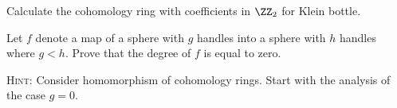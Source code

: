 



\exercises
\begin{xca}
Calculate the cohomology ring with coefficients in $\ZZ_2$ for
Klein bottle.
\end{xca}
\begin{xca}
Let $f$ denote a map of a sphere with $g$ handles into a sphere
with $h$ handles where $g<h$. Prove that the degree of $f$ is
equal to zero.

\textsc{Hint:} Consider homomorphism of cohomology rings. Start
with the analysis of the case $g=0$.
\end{xca}
